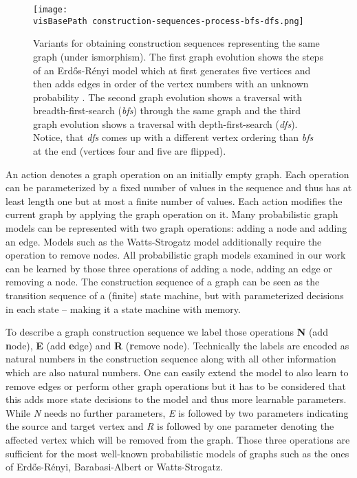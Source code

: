 \documentclass{article}
\newcommand{\visBasePath}[0]{vis/}
\begin{document}
\begin{figure*}
  \begin{minipage}[c]{0.47\linewidth}
    \texttt{[image: \\visBasePath construction-sequences-process-bfs-dfs.png]}
  \end{minipage}\hfill
  \begin{minipage}[c]{0.52\linewidth}
    \caption{
		Variants for obtaining construction sequences representing the same graph (under ismorphism).
		The first graph evolution shows the steps of an Erdős-Rényi model which at first generates five vertices and then adds edges in order of the vertex numbers with an unknown probability .
		The second graph evolution shows a traversal with breadth-first-search (\textit{bfs}) through the same graph and the third graph evolution shows a traversal with depth-first-search (\textit{dfs}).
		Notice, that \textit{dfs} comes up with a different vertex ordering than \textit{bfs} at the end (vertices four and five are flipped).
    } \label{fig:construction-sequences}
  \end{minipage}
\end{figure*}

An action denotes a graph operation on an initially empty graph.
Each operation can be parameterized by a fixed number of values in the sequence and thus has at least length one but at most a finite number of values.
Each action modifies the current graph by applying the graph operation on it.
Many probabilistic graph models can be represented with two graph operations:
adding a node and adding an edge.
Models such as the Watts-Strogatz model additionally require the operation to remove nodes.
All probabilistic graph models examined in our work can be learned by those three operations of adding a node, adding an edge or removing a node.
The construction sequence of a graph can be seen as the transition sequence of a (finite) state machine, but with parameterized decisions in each state -- making it a state machine with memory.

To describe a graph construction sequence we label those operations \textbf{N} (add \textbf{n}ode), \textbf{E} (add \textbf{e}dge) and \textbf{R} (\textbf{r}emove node).
Technically the labels are encoded as natural numbers in the construction sequence along with all other information which are also natural numbers.
One can easily extend the model to also learn to remove edges or perform other graph operations but it has to be considered that this adds more state decisions to the model and thus more learnable parameters.
While \textit{N} needs no further parameters, \textit{E} is followed by two parameters indicating the source and target vertex and \textit{R} is followed by one parameter denoting the affected vertex which will be removed from the graph.
Those three operations are sufficient for the most well-known probabilistic models of graphs such as the ones of Erdős-Rényi, Barabasi-Albert or Watts-Strogatz.
\end{document}
